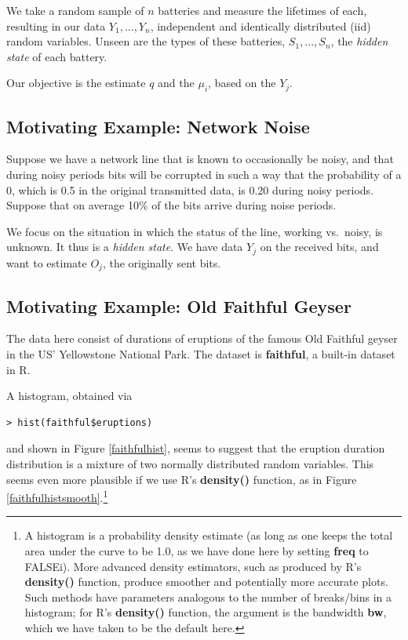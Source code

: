 \documentclass[11pt]{article}
\begin{document}
We take a random sample of $n$ batteries and measure the lifetimes of
each, resulting in our data $Y_1,...,Y_n$, independent and identically
distributed (iid) random variables.  Unseen are the types of these
batteries, $S_1,...,S_n$, the \textit{hidden state} of each battery.

Our objective is the estimate $q$ and the $\mu_i$, based on the $Y_j$.  

\subsection{Motivating Example:  Network Noise}

Suppose we have a network line that is known to occasionally be
noisy, and that during noisy periods bits will be corrupted in such
a way that the probability of a 0, which is 0.5 in the original
transmitted data, is 0.20 during noisy periods.  Suppose that on average
10\% of the bits arrive during noise periods.

We focus on the situation in which the status of the line, working vs.\
noisy, is unknown.  It thus is a \textit{hidden state}.  We have data
$Y_j$ on the received bits, and want to estimate $O_j$, the originally
sent bits.

\subsection{Motivating Example:  Old Faithful Geyser}

The data here consist of durations of eruptions of the famous
Old Faithful geyser in the US' Yellowstone National Park.  The dataset
is \textbf{faithful}, a built-in dataset in R.

A histogram, obtained via 

\begin{lstlisting}
> hist(faithful$eruptions)
\end{lstlisting}

and shown in Figure \ref{faithfulhist}, seems to suggest that the
eruption duration distribution is a mixture of two normally distributed random
variables.  This seems even more plausible if we use R's 
\textbf{density()} function, as in Figure
\ref{faithfulhistsmooth}.\footnote{A histogram is a probability density
estimate (as long as one keeps the total area under the curve to be 1.0,
as we have done here by setting \textbf{freq} to FALSEi).  More advanced
density estimators, such as produced by R's \textbf{density()} function,
produce smoother and potentially more accurate plots.  Such methods have
parameters analogous to the number of breaks/bins in a histogram; for
R's \textbf{density()} function, the argument is the bandwidth
\textbf{bw}, which we have taken to be the default here.}
\end{document}
